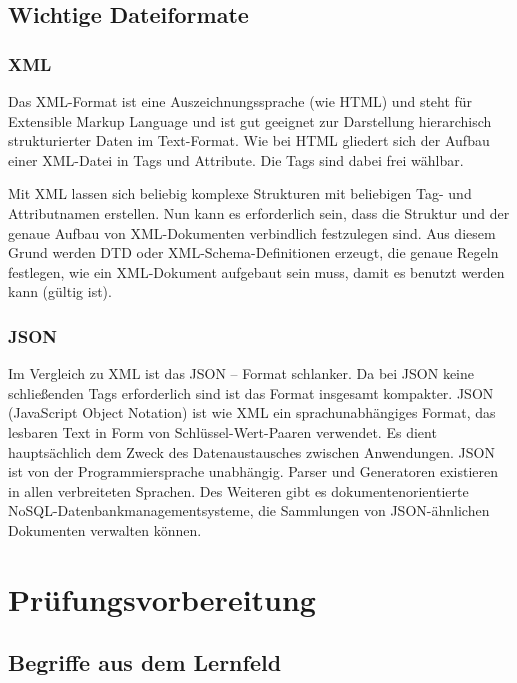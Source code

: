 \documentclass[10pt]{article}
\begin{document}
\begin{flushleft}
\subsection{Wichtige Dateiformate}

\subsubsection{XML}

Das XML-Format ist eine Auszeichnungssprache (wie HTML) und steht für Extensible Markup Language und ist gut geeignet zur Darstellung hierarchisch strukturierter Daten im Text-Format. Wie bei HTML gliedert sich der Aufbau einer XML-Datei in Tags und Attribute. Die Tags sind dabei frei wählbar.

Mit XML lassen sich beliebig komplexe Strukturen mit beliebigen Tag- und Attributnamen erstellen. Nun kann es erforderlich sein, dass die Struktur und der genaue Aufbau von XML-Dokumenten verbindlich festzulegen sind. Aus diesem Grund werden DTD oder XML-Schema-Definitionen erzeugt, die genaue
Regeln festlegen, wie ein XML-Dokument aufgebaut sein muss, damit es benutzt werden kann (gültig ist).


\subsubsection{JSON}

Im Vergleich zu XML ist das JSON – Format schlanker. Da bei JSON keine schließenden Tags erforderlich sind ist das Format insgesamt kompakter. JSON (JavaScript Object Notation) ist wie XML ein sprachunabhängiges Format, das lesbaren Text in Form von Schlüssel-Wert-Paaren verwendet. Es dient hauptsächlich dem Zweck des Datenaustausches zwischen Anwendungen. JSON ist von der Programmiersprache unabhängig. Parser und Generatoren existieren in allen verbreiteten Sprachen. Des Weiteren gibt es dokumentenorientierte NoSQL-Datenbankmanagementsysteme, die Sammlungen von JSON-ähnlichen Dokumenten verwalten können.

\break

\section{Prüfungsvorbereitung}

\subsection{Begriffe aus dem Lernfeld}


\end{flushleft}
\end{document}
